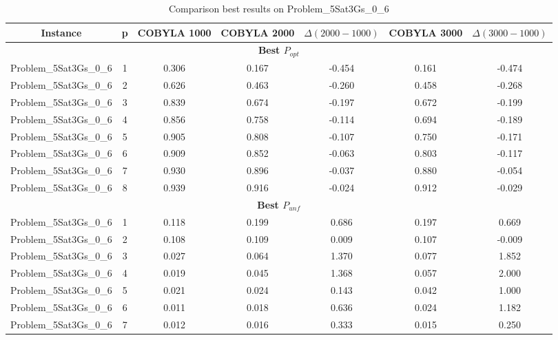 \begin{table}[!htbp]
    \renewcommand{\arraystretch}{0.7}
    \scriptsize
    \centering
    \caption{Comparison best results on Problem\_5Sat3Gs\_0\_6}
    \begin{adjustbox}{max width=\columnwidth}
        \begin{tabularx}{\columnwidth}{c|c c c c c c}
            \toprule
            \textbf{Instance} & \textbf{p} & \textbf{COBYLA 1000} & \textbf{COBYLA 2000} & $\Delta(2000-1000)$ & \textbf{COBYLA 3000} & $\Delta(3000-1000)$ \\
            \midrule
            \multicolumn{7}{c}{\textbf{Best $P_{opt}$}} \\ \midrule
            Problem\_5Sat3Gs\_0\_6 & 1 & 0.306 & 0.167 & -0.454 & 0.161 & -0.474 \\
            Problem\_5Sat3Gs\_0\_6 & 2 & 0.626 & 0.463 & -0.260 & 0.458 & -0.268 \\
            Problem\_5Sat3Gs\_0\_6 & 3 & 0.839 & 0.674 & -0.197 & 0.672 & -0.199 \\
            Problem\_5Sat3Gs\_0\_6 & 4 & 0.856 & 0.758 & -0.114 & 0.694 & -0.189 \\
            Problem\_5Sat3Gs\_0\_6 & 5 & 0.905 & 0.808 & -0.107 & 0.750 & -0.171 \\
            Problem\_5Sat3Gs\_0\_6 & 6 & 0.909 & 0.852 & -0.063 & 0.803 & -0.117 \\
            Problem\_5Sat3Gs\_0\_6 & 7 & 0.930 & 0.896 & -0.037 & 0.880 & -0.054 \\
            Problem\_5Sat3Gs\_0\_6 & 8 & 0.939 & 0.916 & -0.024 & 0.912 & -0.029 \\
            \multicolumn{7}{c}{\textbf{Best $P_{unf}$}} \\ \midrule
            Problem\_5Sat3Gs\_0\_6 & 1 & 0.118 & 0.199 & 0.686 & 0.197 & 0.669 \\
            Problem\_5Sat3Gs\_0\_6 & 2 & 0.108 & 0.109 & 0.009 & 0.107 & -0.009 \\
            Problem\_5Sat3Gs\_0\_6 & 3 & 0.027 & 0.064 & 1.370 & 0.077 & 1.852 \\
            Problem\_5Sat3Gs\_0\_6 & 4 & 0.019 & 0.045 & 1.368 & 0.057 & 2.000 \\
            Problem\_5Sat3Gs\_0\_6 & 5 & 0.021 & 0.024 & 0.143 & 0.042 & 1.000 \\
            Problem\_5Sat3Gs\_0\_6 & 6 & 0.011 & 0.018 & 0.636 & 0.024 & 1.182 \\
            Problem\_5Sat3Gs\_0\_6 & 7 & 0.012 & 0.016 & 0.333 & 0.015 & 0.250 \\

\end{tabularx}
\end{adjustbox}
\end{table}
